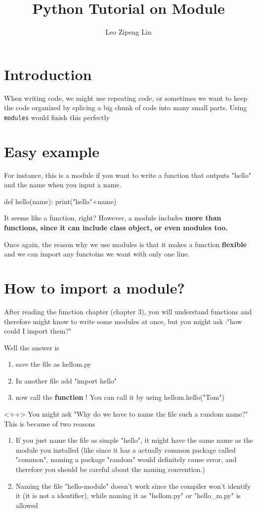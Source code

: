 \documentclass[12pt]{article}
\title{Python Tutorial on Module}
\author{Leo Zipeng Lin}
\begin{document}
\maketitle
\newpage
\section{Introduction}
\par When writing code, we might use repeating code, or sometimes we want to keep the code organized by splicing a big chunk of code into many small parts. Using \texttt{modules} would finish this perfectly
\section{Easy example}
For instance, this is a module if you want to write a function that outputs "hello" and the name when you input a name.
\begin{python}
	def hello(name):
		print("hello"+name)
\end{python}
It seems like a function, right? However, a module includes \textbf{more than functions, since it can include class object, or even modules too.}

Once again, the reason why we use modules is that it makes a function \textbf{flexible} and we can import any functoins we want with only one line.
\section{How to import a module?}
After reading the function chapter (chapter 3), you will understand functions and therefore might know to write some modules at once, but you might ask :"how could I import them?"

Well the answer is
\begin{enumerate}
	\item save the file as hellom.py
	\item In another file add "import hello"
	\item now call the \textbf{function} ! You can call it by using hellom.hello("Tom")
\end{enumerate}<++>
		You might ask "Why do we have to name the file such a random name?" This is because of two reasons
		\begin{enumerate}
			\item If you just name the file as simple "hello", it might have the same name as the module you installed (like since it has a actually common package called "common", naming a package "random" would definitely cause error, and therefore you should be careful about the naming convention.)
			\item Naming the file "hello-module" doesn't work since the compiler won't identify it (it is not a identifier), while naming it as "hellom.py" or "hello\_m.py" is allowed
		\end{enumerate}
\end{document}
